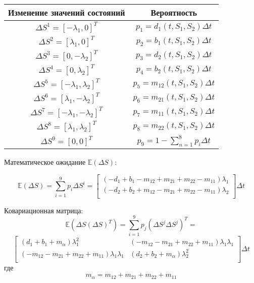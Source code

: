 \documentclass[notes,compress]{beamer}
\begin{document}
\begin{frame}
    \begin{table}
    \begin{center}
    \begin{tabular}{|c|c|}
    \hline
    \textbf{Изменение значений состояний} & \textbf{Вероятность}\\
    \hline
    $\Delta S^1 = [- \lambda_1, 0]^T$ &  $p_1=d_1 (t, S_1, S_2) \Delta t$ \\
    $\Delta S^2 = [ \lambda_1, 0]^T$ &  $p_2=b_1 (t, S_1, S_2) \Delta t$ \\
    $\Delta S^3 = [ 0, - \lambda_2]^T$ &  $p_3=d_2 (t, S_1, S_2) \Delta t$ \\
    $\Delta S^4 = [ 0, \lambda_2]^T$ &  $p_4=b_2 (t, S_1, S_2) \Delta t$ \\
    $\Delta S^5 = [- \lambda_1, \lambda_2]^T$ &  $p_5=m_{12} (t, S_1, S_2) \Delta t$ \\
    $\Delta S^6 = [ \lambda_1,- \lambda_2]^T$ &  $p_6=m_{21} (t, S_1, S_2) \Delta t$ \\
    $\Delta S^7 = [- \lambda_1,- \lambda_2]^T$ &  $p_7=m_{11} (t, S_1, S_2) \Delta t$ \\
    $\Delta S^8 = [ \lambda_1, \lambda_2]^T$ &  $p_8=m_{22} (t, S_1, S_2) \Delta t$ \\
    $\Delta S^9 = [0, 0]^T$ &  $p_9= 1 - \sum_{n=1}^8 p_i \Delta t$ \\
    \hline

    \end{tabular}
    \end{center}
    \end{table}
\end{frame}

\begin{frame}
Математическое ожидание  $\mathbb{E}(\Delta S)$:

\[
    \mathbb{E}(\Delta S) = \sum_{i=1}^9 p_i \Delta S^i =
        \begin{bmatrix}
            (-d_1+ b_1 - m_{12} + m_{21} + m_{22} - m_{11}) \lambda_1 \\
            (-d_2+ b_2 + m_{12} - m_{21} + m_{22} - m_{11}) \lambda_2 \\
        \end{bmatrix}\Delta t
\]


\small
    Ковариационная матрица:
    \[
        \mathbb{E}(\Delta S (\Delta S)^T) = \sum_{i=1}^9 p_j (\Delta S^j \Delta S^j)^T =
        \]\[\begin{bmatrix}
            (d_1+ b_1 + m_\alpha)\lambda_1^2 & (- m_{12} - m_{21} + m_{22} + m_{11}) \lambda_1 \lambda_1 \\
            (- m_{12} - m_{21} + m_{22} + m_{11}) \lambda_1 \lambda_1 &  (d_2+ b_2 + m_\alpha)\lambda_2^2 \\
        \end{bmatrix}
        \Delta t
    \]
\newline
где \[m_\alpha = m_{12} + m_{21} + m_{22} + m_{11}\]

\end{frame}
\end{document}
